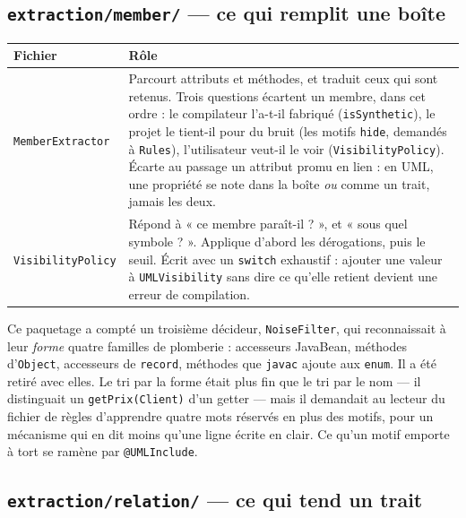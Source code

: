 \documentclass[12pt, a4paper]{article}
\begin{document}
\subsection{\texttt{extraction/member/} — ce qui remplit une boîte}

\begin{longtable}{L{4.2cm} L{10cm}}
\toprule
\textbf{Fichier} & \textbf{Rôle} \\
\midrule
\endhead
\texttt{MemberExtractor} &
Parcourt attributs et méthodes, et traduit ceux qui sont retenus. Trois questions écartent un
membre, dans cet ordre : le compilateur l'a-t-il fabriqué (\texttt{isSynthetic}), le projet le
tient-il pour du bruit (les motifs \texttt{hide}, demandés à \texttt{Rules}), l'utilisateur
veut-il le voir (\texttt{VisibilityPolicy}). Écarte au passage un attribut promu en lien : en
UML, une propriété se note dans la boîte \emph{ou} comme un trait, jamais les deux. \\
\addlinespace
\texttt{VisibilityPolicy} &
Répond à « ce membre paraît-il ? », et « sous quel symbole ? ». Applique d'abord les
dérogations, puis le seuil. Écrit avec un \texttt{switch} exhaustif : ajouter une valeur à
\texttt{UMLVisibility} sans dire ce qu'elle retient devient une erreur de compilation. \\
\bottomrule
\end{longtable}

\noindent Ce paquetage a compté un troisième décideur, \texttt{NoiseFilter}, qui reconnaissait à
leur \emph{forme} quatre familles de plomberie : accesseurs JavaBean, méthodes d'\texttt{Object},
accesseurs de \texttt{record}, méthodes que \texttt{javac} ajoute aux \texttt{enum}. Il a été
retiré avec elles. Le tri par la forme était plus fin que le tri par le nom --- il distinguait un
\texttt{getPrix(Client)} d'un getter --- mais il demandait au lecteur du fichier de règles
d'apprendre quatre mots réservés en plus des motifs, pour un mécanisme qui en dit moins qu'une
ligne écrite en clair. Ce qu'un motif emporte à tort se ramène par \texttt{@UMLInclude}.

\subsection{\texttt{extraction/relation/} — ce qui tend un trait}
\end{document}
